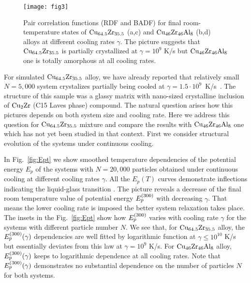 \documentclass[jcp,twocolumn,superscriptaddress,floatfix,graphicx,showpacs]{revtex4-1}
\begin{document}
 \begin{figure}
  \centering
  \texttt{[image: fig3]}\\
  \caption{Pair correlation functions (RDF and BADF) for final room-temperature states of ${\rm Cu_{64.5}Zr_{35.5}}$ (a,c) and ${\rm Cu_{46}Zr_{46}Al_{8}}$ (b,d) alloys at different cooling rates $\gamma$. The picture suggests that ${\rm Cu_{64.5}Zr_{35.5}}$ is partially crystallized at $\gamma=10^9$ K/s but ${\rm Cu_{46}Zr_{46}Al_{8}}$ one is totally amorphous at all cooling rates.}
  \label{fig:corr}
\end{figure}

For simulated  ${\rm Cu_{64.5}Zr_{35.5}}$ alloy, we have already reported that relatively small $N=5,000$ system crystalizes partially being cooled at $\gamma = 1.5\cdot 10^{9}$~K/s~\cite{Ryltsev2016JCP}. The structure of this sample was a glassy matrix with nano-sized crystalline inclusion of ${\rm Cu_2Zr}$ (C15 Laves phase) compound. The natural question arises how this pictures depends on both system size and cooling rate. Here we address this question for ${\rm Cu_{64.5}Zr_{35.5}}$  mixture and compare the results with ${\rm Cu_{46}Zr_{46}Al_{8}}$ one which has not yet been studied in that context. First we consider structural evolution of the systems under continuous cooling.

In Fig.~\ref{fig:Ept} we show smoothed temperature dependencies of the potential energy $E_{p}$ of the systems with $N=20,000$ particles obtained under continuous cooling at different cooling rates $\gamma$. All the $E_p(T)$ curves demonstrate inflections indicating the liquid-glass transition \cite{Mendelev2009PhilMag_2}. The picture reveals a decrease of the final room temperature value of potential energy $E^{\rm(300)}_{p}$ with decreasing $\gamma$. That means the lower cooling rate is imposed the better system relaxation takes place. The insets in the Fig.~\ref{fig:Ept} show how $E^{\rm(300)}_{p}$ varies with cooling rate $\gamma$ for the systems with different particle number $N$. We see that, for ${\rm Cu_{64.5}Zr_{35.5}}$ alloy, the $E^{\rm(300)}_{p}(\gamma)$ dependencies are well fitted by logarithmic function at $\gamma \leq 10^{10}$ K/s but essentially deviates from this law at $\gamma = 10^{9}$ K/s. For ${\rm Cu_{46}Zr_{46}Al_{8}}$ alloy, $E^{\rm(300)}_{p}(\gamma)$ keeps to logarithmic dependence at all cooling rates. Note that $E^{\rm(300)}_{p}(\gamma)$ demonstrates no substantial dependence on the number of particles $N$ for both systems.
\end{document}
